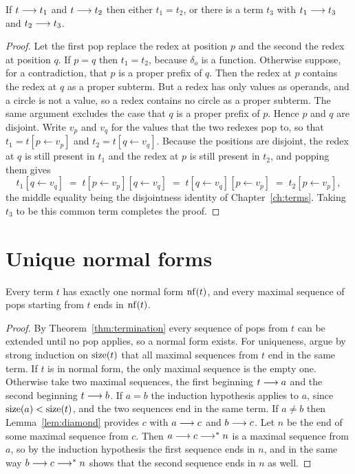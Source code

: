\begin{lemma}\label{lem:diamond}
If $t\longrightarrow t_1$ and $t\longrightarrow t_2$ then either $t_1=t_2$, or there is a term $t_3$ with $t_1\longrightarrow t_3$ and $t_2\longrightarrow t_3$.
\end{lemma}
\begin{proof}
Let the first pop replace the redex at position $p$ and the second the redex at position $q$. If $p=q$ then $t_1=t_2$, because $\delta_o$ is a function. Otherwise suppose, for a contradiction, that $p$ is a proper prefix of $q$. Then the redex at $p$ contains the redex at $q$ as a proper subterm. But a redex has only values as operands, and a circle is not a value, so a redex contains no circle as a proper subterm. The same argument excludes the case that $q$ is a proper prefix of $p$. Hence $p$ and $q$ are disjoint. Write $v_p$ and $v_q$ for the values that the two redexes pop to, so that $t_1=t[p\leftarrow v_p]$ and $t_2=t[q\leftarrow v_q]$. Because the positions are disjoint, the redex at $q$ is still present in $t_1$ and the redex at $p$ is still present in $t_2$, and popping them gives
\[
t_1[q\leftarrow v_q] \;=\; t[p\leftarrow v_p][q\leftarrow v_q] \;=\; t[q\leftarrow v_q][p\leftarrow v_p] \;=\; t_2[p\leftarrow v_p],
\]
the middle equality being the disjointness identity of Chapter~\ref{ch:terms}. Taking $t_3$ to be this common term completes the proof.
\end{proof}

\section{Unique normal forms}

\begin{theorem}\label{thm:unique}
Every term $t$ has exactly one normal form $\operatorname{nf}(t)$, and every maximal sequence of pops starting from $t$ ends in $\operatorname{nf}(t)$.
\end{theorem}
\begin{proof}
By Theorem~\ref{thm:termination} every sequence of pops from $t$ can be extended until no pop applies, so a normal form exists. For uniqueness, argue by strong induction on $\operatorname{size}(t)$ that all maximal sequences from $t$ end in the same term. If $t$ is in normal form, the only maximal sequence is the empty one. Otherwise take two maximal sequences, the first beginning $t\longrightarrow a$ and the second beginning $t\longrightarrow b$. If $a=b$ the induction hypothesis applies to $a$, since $\operatorname{size}(a)<\operatorname{size}(t)$, and the two sequences end in the same term. If $a\neq b$ then Lemma~\ref{lem:diamond} provides $c$ with $a\longrightarrow c$ and $b\longrightarrow c$. Let $n$ be the end of some maximal sequence from $c$. Then $a\longrightarrow c\longrightarrow^{*} n$ is a maximal sequence from $a$, so by the induction hypothesis the first sequence ends in $n$, and in the same way $b\longrightarrow c\longrightarrow^{*} n$ shows that the second sequence ends in $n$ as well.
\end{proof}

